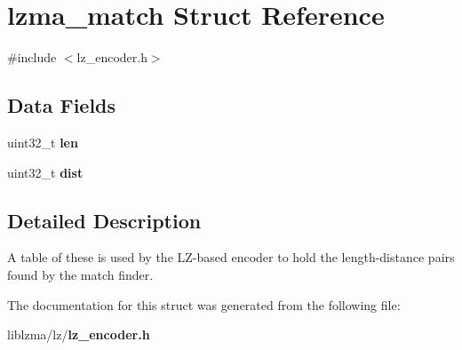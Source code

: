 \section{lzma\-\_\-match Struct Reference}
\label{structlzma__match}


{\ttfamily \#include $<$lz\-\_\-encoder.\-h$>$}

\subsection*{Data Fields}
\begin{DoxyCompactItemize}
\item 
uint32\-\_\-t {\bfseries len}\label{structlzma__match_a83e144a036dc055ac6d68dfd3b17f9fc}

\item 
uint32\-\_\-t {\bfseries dist}\label{structlzma__match_aca321e5f1e0f297dbd80e1301b0a6ccc}

\end{DoxyCompactItemize}


\subsection{Detailed Description}
A table of these is used by the L\-Z-\/based encoder to hold the length-\/distance pairs found by the match finder. 

The documentation for this struct was generated from the following file\-:\begin{DoxyCompactItemize}
\item 
liblzma/lz/{\bf lz\-\_\-encoder.\-h}\end{DoxyCompactItemize}
